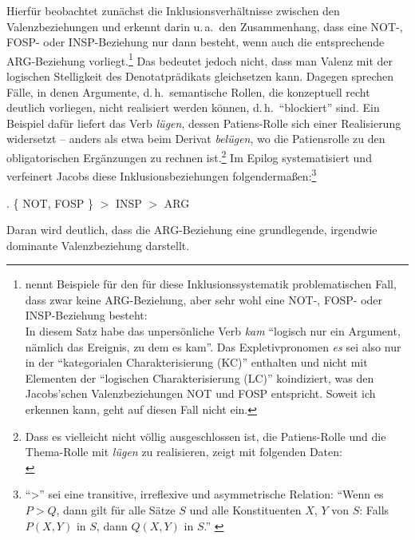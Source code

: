 Hierfür beobachtet \citet[64--68]{Jacobs:94} zunächst die Inklusionsverhältnisse zwischen den Valenzbeziehungen und erkennt darin u.\,a.\ den Zusammenhang, dass eine NOT-, FOSP- oder INSP-Beziehung nur dann besteht, wenn auch die entsprechende ARG-Beziehung vorliegt.\footnote{\citet[227f]{Vater:81} nennt Beispiele für den für diese Inklusionssystematik problematischen Fall, dass zwar keine ARG-Beziehung, aber sehr wohl eine NOT-, FOSP- oder INSP-Beziehung besteht:\\
In diesem Satz habe das unpersönliche Verb {\it kam} "`logisch nur ein Argument, nämlich das Ereignis, zu dem es kam"'. Das Expletivpronomen {\it es} sei also nur in der "`kategorialen Charakterisierung (KC)"' enthalten und nicht mit Elementen der "`logischen Charakterisierung (LC)"' koindiziert, was den Jacobs'schen Valenzbeziehungen NOT und FOSP entspricht. Soweit ich erkennen kann, geht \cite{Jacobs:94} auf diesen Fall nicht ein.} Das bedeutet jedoch nicht, dass man Valenz mit der logischen Stelligkeit des Denotatprädikats gleichsetzen kann. Dagegen sprechen Fälle, in denen Argumente, d.\,h.\ semantische Rollen, die konzeptuell recht deutlich vorliegen, nicht realisiert werden können, d.\,h.\ "`blockiert"' \citep[36]{Steinitz:92} sind. Ein Beispiel dafür liefert das Verb {\it lügen}, dessen Patiens-Rolle sich einer Realisierung widersetzt -- anders als etwa beim Derivat {\it belügen}, wo die Patiensrolle zu den obligatorischen Ergänzungen zu rechnen ist.\label{ex-luegen}\footnote{Dass es vielleicht nicht völlig ausgeschlossen ist, die Patiens-Rolle und die Thema-Rolle mit {\it lügen} zu realisieren, zeigt \cite{Storrer:96} mit folgenden Daten:\\
} 
Im Epilog systematisiert und verfeinert Jacobs diese Inklusionsbeziehungen folgendermaßen:\footnote{"`>"' sei eine transitive, irreflexive und asymmetrische Relation: "`Wenn es $P > Q$, dann gilt für alle Sätze $S$ und alle Konstituenten $X$, $Y$ von $S$: Falls $P(X,Y)$ in $S$, dann $Q(X,Y)$ in $S$."' \citep[65]{Jacobs:94}}

\ex. \{ NOT, FOSP \} $>$ INSP $>$ ARG \hfill \label{ex:inklusion}\citep[71]{Jacobs:94}

Daran wird deutlich, dass die ARG-Beziehung eine grundlegende, irgendwie dominante Valenzbeziehung darstellt. 


